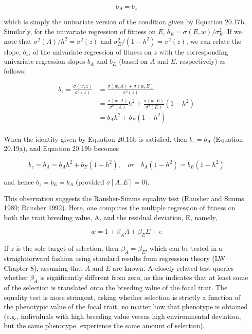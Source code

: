 \documentclass{article}
\begin{document}
\begin{equation}
b_{A}=b_{z}
\tag{20.19a}
\label{eq:20_19a}
\end{equation}

which is simply the univariate version of the condition given by Equation 20.17b. Similarly, for the univariate regression of fitness on $E$, $b_E = \sigma(E, w)/\sigma_E^2$. If we note that $\sigma^2(A)/h^2 = \sigma^2(z)$ and $\sigma_E^2/(1 - h^2) = \sigma^2(z)$, we can relate the slope, $b_z$, of the univariate regression of fitness on $z$ with the corresponding univariate regression slopes $b_A$ and $b_E$ (based on $A$ and $E$, respectively) as follows:

\begin{equation}
\begin{aligned}b_{z}=\frac{\sigma(w,z)}{\sigma^{2}(z)}&=\frac{\sigma(w,A)+\sigma(w,E)}{\sigma^{2}(z)}\\&=\frac{\sigma(w,A)}{\sigma^{2}(A)}h^{2}+\frac{\sigma(w,E)}{\sigma^{2}(E)}(1-h^{2})\\&=b_{A}h^{2}+b_{E}(1-h^{2})\\ \end{aligned}
\tag{20.19b}
\label{eq:20_19b}
\end{equation}

When the identity given by Equation 20.16b is satisfied, then  $ b_{z} = b_{A} $ (Equation 20.19a), and Equation 20.19b becomes

\begin{equation}
b_{z}=b_{A}=b_{A}h^{2}+b_{E}(1-h^{2}),\quad or\quad b_{A}(1-h^{2})=b_{E}(1-h^{2})
\end{equation}

and hence  $ b_{z}=b_{E}=b_{A} $ (provided  $ \sigma[A,E]=0 $).

This observation suggests the Rausher-Simms equality test (Rausher and Simms 1989; Rausher 1992). Here, one computes the multiple regression of fitness on both the trait breeding value, A, and the residual deviation, E, namely,

\begin{equation}
w=1+\beta_{A}A+\beta_{E}E+e
\tag{20.20}
\label{eq:20_20}
\end{equation}

If $z$ is the sole target of selection, then $\beta_{A} = \beta_{E}$, which can be tested in a straightforward fashion using standard results from regression theory (LW Chapter 8), assuming that $A$ and $E$ are known. A closely related test queries whether $\beta_{A}$ is significantly different from zero, as this indicates that at least some of the selection is translated onto the breeding value of the focal trait. The equality test is more stringent, asking whether selection is strictly a function of the phenotypic value of the focal trait, no matter how that phenotype is obtained (e.g., individuals with high breeding value versus high environmental deviation, but the same phenotype, experience the same amount of selection).
\end{document}

